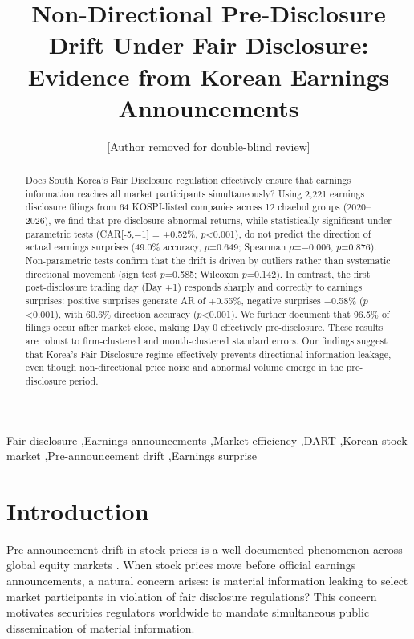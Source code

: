 \documentclass[review,authoryear]{elsarticle}
\begin{document}
\begin{frontmatter}

\title{Non-Directional Pre-Disclosure Drift Under Fair Disclosure: Evidence from Korean Earnings Announcements}

\author{[Author removed for double-blind review]}

\begin{abstract}
Does South Korea's Fair Disclosure regulation effectively ensure that earnings information reaches all market participants simultaneously? Using 2,221 earnings disclosure filings from 64 KOSPI-listed companies across 12 chaebol groups (2020--2026), we find that pre-disclosure abnormal returns, while statistically significant under parametric tests (CAR[-5,$-$1] = +0.52\%, $p$<0.001), do not predict the direction of actual earnings surprises (49.0\% accuracy, $p$=0.649; Spearman $\rho$=$-$0.006, $p$=0.876). Non-parametric tests confirm that the drift is driven by outliers rather than systematic directional movement (sign test $p$=0.585; Wilcoxon $p$=0.142). In contrast, the first post-disclosure trading day (Day +1) responds sharply and correctly to earnings surprises: positive surprises generate AR of +0.55\%, negative surprises $-$0.58\% ($p$<0.001), with 60.6\% direction accuracy ($p$<0.001). We further document that 96.5\% of filings occur after market close, making Day 0 effectively pre-disclosure. These results are robust to firm-clustered and month-clustered standard errors. Our findings suggest that Korea's Fair Disclosure regime effectively prevents directional information leakage, even though non-directional price noise and abnormal volume emerge in the pre-disclosure period.
\end{abstract}

\begin{keyword}
Fair disclosure \sep Earnings announcements \sep Market efficiency \sep DART \sep Korean stock market \sep Pre-announcement drift \sep Earnings surprise
\end{keyword}

\end{frontmatter}

\section{Introduction}

Pre-announcement drift in stock prices is a well-documented phenomenon across global equity markets \citep{kaniel2012individual}. When stock prices move before official earnings announcements, a natural concern arises: is material information leaking to select market participants in violation of fair disclosure regulations? This concern motivates securities regulators worldwide to mandate simultaneous public dissemination of material information.
\end{document}
